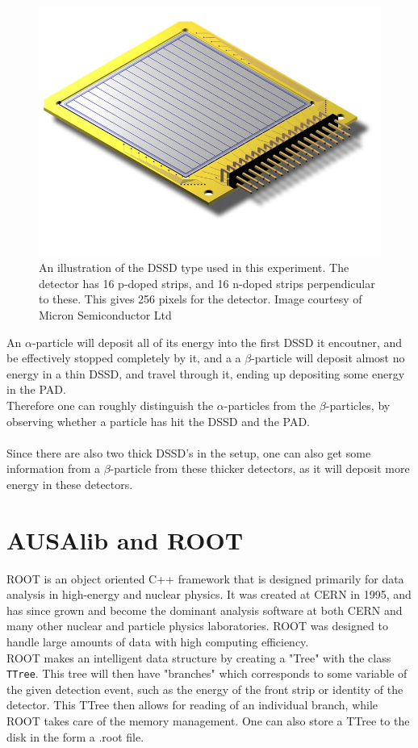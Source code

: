 \begin{figure}[h]
	\centering
	\includegraphics[width=\columnwidth]{../figures/W1.jpg}
	\caption{An illustration of the DSSD type used in this experiment. The detector has 16 p-doped strips, and 16 n-doped strips perpendicular to these. This gives 256 pixels for the detector. Image courtesy of Micron Semiconductor Ltd}
	\label{fig:W1}
\end{figure}

An $\alpha$-particle will deposit all of its energy into the first DSSD it encoutner, and be effectively stopped completely by it, and a a $\beta$-particle will deposit almost no energy in a thin DSSD, and travel through it, ending up depositing some energy in the PAD. \\
Therefore one can roughly distinguish the $\alpha$-particles from the $\beta$-particles, by observing whether a particle has hit the DSSD and the PAD. \\
\\
Since there are also two thick DSSD's in the setup, one can also get some information from a $\beta$-particle from these thicker detectors, as it will deposit more energy in these detectors. 




\section{AUSAlib and ROOT}
ROOT \cite{ROOT} is an object oriented C++ framework that is designed primarily for data analysis in high-energy and nuclear physics. It was created at CERN in 1995, and has since grown and become the dominant analysis software at both CERN and many other nuclear and particle physics laboratories. 
ROOT was designed to handle large amounts of data with high computing efficiency. \\
ROOT makes an intelligent data structure by creating a "Tree" with the class \texttt{TTree}. This tree will then have "branches" which corresponds to some variable of the given detection event, such as the energy of the front strip or identity of the detector. This TTree then allows for reading of an individual branch, while ROOT takes care of the memory management. One can also store a TTree to the disk in the form a .root file. \\

